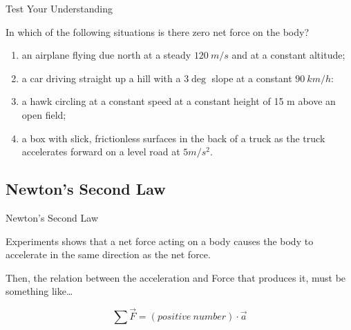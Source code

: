 \documentclass[]{beamer}
\begin{document}


\begin{frame}

  Test Your Understanding 
  \vspace{3mm}
  
  In which of the following  situations is there zero net force on the body? 
  
  \begin{enumerate}
    \item an airplane flying due north at a steady $120~m/s$ and at a constant altitude;
    \item a car driving straight up a hill with a $3\deg$ slope at a constant $90~km/h$:
    \item a hawk circling at a constant speed at a constant height of 15 m above an open field;
    \item  a box with slick, frictionless surfaces in the back of a truck as the truck 
    accelerates forward on a level road at $5 m/s^ 2$.
  \end{enumerate}
  
  
 
     \end{frame}


\subsection{  Newton's Second Law }
\begin{frame}

 Newton's Second Law 
  \vspace{3mm}
  
  Experiments shows that a net force acting on a body causes the body to accelerate in
  the same direction as the net force.
  \vspace{3mm}
 
\pause
\vspace{5mm}


Then, the relation between the acceleration and Force that produces it, must be something like\dots

\begin{equation}
  \sum\vec{F}=(positive~number)\cdot \vec{a}
\end{equation}


     \end{frame}
\end{document}
